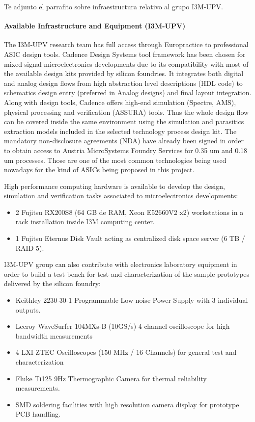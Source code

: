 Te adjunto el parrafito sobre infraestructura relativo al grupo I3M-UPV. 

\paragraph{Available Infrastructure and Equipment (I3M-UPV)}
The I3M-UPV research team has full access through Europractice to professional ASIC design tools. Cadence Design Systems tool framework has been chosen for mixed signal microelectronics developments due to its compatibility with most of the available design kits provided by silicon foundries. It integrates both digital and analog design flows from high abstraction level descriptions (HDL code) to schematics design entry (preferred in Analog designs) and final layout integration. Along with design tools, Cadence offers high-end simulation (Spectre, AMS), physical processing and verification (ASSURA) tools. Thus the whole design flow can be covered inside the same environment using the simulation and parasitics extraction models included in the selected technology process design kit. The mandatory non-disclosure agreements (NDA) have already been signed in order to obtain access to Austria MicroSystems Foundry Services for 0.35 um and 0.18 um processes. Those are one of the most common technologies being used nowadays for the kind of ASICs being proposed in this project.

\par High performance computing hardware is available to develop the design, simulation and verification tasks associated to microelectronics developments:
\begin{itemize}
 \item 2 Fujitsu RX200S8 (64 GB de RAM, Xeon E52660V2 x2) workstations in a rack installation inside I3M computing center.
 \item 1 Fujitsu Eternus Disk Vault acting as centralized disk space server (6 TB / RAID 5).
\end{itemize}

\par I3M-UPV group can also contribute with electronics laboratory equipment in order to build a test bench for test and characterization of the sample prototypes delivered by the silicon foundry:
\begin{itemize}
 \item Keithley 2230-30-1 Programmable Low noise Power Supply with 3 individual outputs.
 \item Lecroy WaveSurfer 104MXs-B (10GS/s) 4 channel oscilloscope for high bandwidth measurements
 \item 4 LXI ZTEC Oscilloscopes (150 MHz / 16 Channels) for general test and characterization
 \item Fluke Ti125 9Hz Thermographic Camera for thermal reliability measurements.
 \item SMD soldering facilities with high resolution camera display for prototype PCB handling.
\end{itemize}

